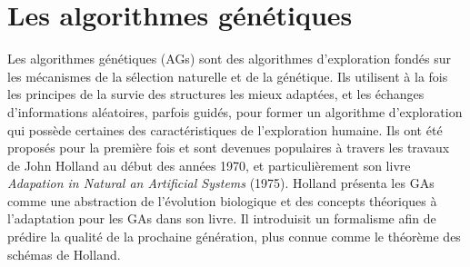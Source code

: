 \documentclass[12pt,a4paper]{article}
\begin{document}
	\section{Les algorithmes génétiques}
		
	Les algorithmes génétiques (AGs) sont des algorithmes d’exploration fondés sur les mécanismes de la sélection naturelle et de la génétique. Ils utilisent à la fois les principes de la survie des structures les mieux adaptées, et les échanges d’informations aléatoires, parfois guidés, pour former un algorithme d’exploration qui possède certaines des caractéristiques de l’exploration humaine. Ils ont été proposés pour la première fois et sont devenues populaires à travers les travaux de John Holland au début des années 1970, et particulièrement son livre \emph{Adapation in Natural an Artificial Systems} (1975). Holland présenta les GAs comme une abstraction de l'évolution biologique et des concepts théoriques à l'adaptation pour les GAs dans son livre. Il introduisit un formalisme afin de prédire la qualité de la prochaine génération, plus connue comme le théorème des schémas de Holland.
	
\end{document}
